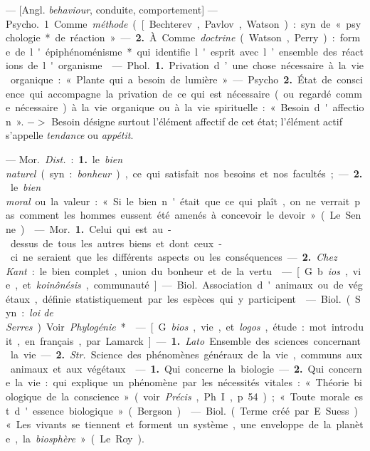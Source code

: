 \begin{itemize}[leftmargin=1cm, label=, itemsep=1pt]
 — [Angl. {\it behaviour}, conduite, comportement] — \si{Psycho.}
1. Comme {\it méthode} ([Bechterev,
Pavlov, Watson) : syn. de « psychologie* de réaction ». — {\bf 2.} À. Comme
{\it doctrine} (Watson, Perry) : forme de
l'épiphénoménisme* qui identifie
l'esprit avec l’ensemble des réactions
de l'organisme.

 — \si{Phol.} {\bf 1.} Privation d’une
chose nécessaire à la vie organique :
« Plante qui a besoin de lumière ».

— \si{Psycho} {\bf 2.} État de conscience
qui accompagne la privation de ce
qui est nécessaire (ou regardé comme
nécessaire) à la vie organique ou à la
vie spirituelle : « Besoin d'affection».
$->$ Besoin désigne surtout l'élément
affectif de cet état; l’élément actif
s'appelle {\it tendance} ou {\it appétit}.

 — \si{Mor.} {\it Dist.} : {\bf 1.} le {\it bien naturel}
(syn. : {\it bonheur}), ce qui satisfait nos
besoins et nos facultés; — {\bf 2.} le {\it bien
moral} ou la valeur : « Si le bien
n'était que ce qui plaît, on ne verrait pas comment les hommes eussent
été amenés à concevoir le devoir »
(Le Senne).

 — \si{Mor.} {\bf 1.} Celui
qui est au-dessus de tous les autres
biens et dont ceux-ci ne seraient que
les différents aspects ou les conséquences. — {\bf 2.} {\it Chez Kant} : le bien
complet, union du bonheur et de la
vertu.

 — [G. b{\it ios}, vie, et {\it koinônésis},
communauté] — \si{Biol.} Association
d'animaux ou de végétaux, définie
statistiquement par les espèces qui y
participent.

 — \si{Biol.} (Syn. :
{\it loi de Serres}). Voir {\it Phylogénie}*.

 — [G. {\it bios}, vie, et {\it logos}, étude :
mot introduit, en français, par
Lamarck] — {\bf 1.} {\it Lato}. Ensemble des
sciences concernant la vie. — {\bf 2.} {\it Str.}
Science des phénomènes généraux
de la vie, communs aux animaux et
aux végétaux.

 — {\bf 1.} Qui concerne la
biologie. — {\bf 2.} Qui concerne la vie:
qui explique un phénomène par les
nécessités vitales : « Théorie biologique
de la conscience » (voir {\it Précis},
Ph. I, p. 54); « Toute morale est
d'essence biologique » (Bergson).

 — \si{Biol.} (Terme créé par
E. Suess). « Les vivants se tiennent
et forment un système, une enveloppe de la planète, la {\it biosphère} »
(Le Roy).


\end{itemize}
